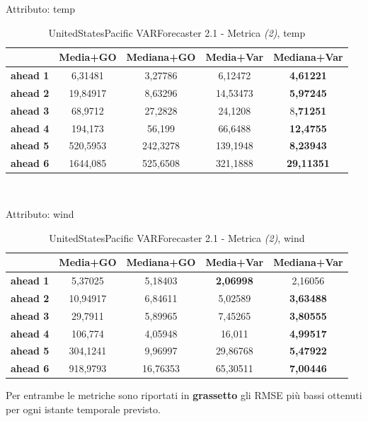 \documentclass[12pt,a4paper,oneside,openright]{book}
\begin{document}
\medskip

Attributo: temp \\ 

\begin{table}[H]
\centering
\begin{tabular}{|c|c|c|c|c|}
\hline
 & \textbf{Media+GO} & \textbf{Mediana+GO} & \textbf{Media+Var} & \textbf{Mediana+Var} \\
\hline
\textbf{ahead 1} & 6,31481 & 3,27786 & 6,12472 & \textbf{4,61221} \\
\hline
\textbf{ahead 2} & 19,84917 & 8,63296 & 14,53473 & \textbf{5,97245} \\
\hline
\textbf{ahead 3} & 68,9712 & 27,2828 & 24,1208 & 8\textbf{,71251} \\
\hline
\textbf{ahead 4} & 194,173 & 56,199 & 66,6488 & \textbf{12,4755} \\
\hline
\textbf{ahead 5} & 520,5953 & 242,3278 & 139,1948 & \textbf{8,23943} \\
\hline
\textbf{ahead 6} & 1644,085 & 525,6508 & 321,1888 & \textbf{29,11351} \\
\hline
\end{tabular} \\
\caption{UnitedStatesPacific VARForecaster 2.1 - Metrica \textit{(2)}, temp}
\end{table}

\medskip

Attributo: wind \\ 

\begin{table}[H]
\centering
\begin{tabular}{|c|c|c|c|c|}
\hline
 & \textbf{Media+GO} & \textbf{Mediana+GO} & \textbf{Media+Var} & \textbf{Mediana+Var} \\
\hline
\textbf{ahead 1} & 5,37025 & 5,18403 & \textbf{2,06998} & 2,16056 \\
\hline
\textbf{ahead 2} & 10,94917 & 6,84611 & 5,02589 & \textbf{3,63488} \\
\hline
\textbf{ahead 3} & 29,7911 & 5,89965 & 7,45265 & \textbf{3,80555} \\
\hline
\textbf{ahead 4} & 106,774 & 4,05948 & 16,011 & \textbf{4,99517} \\
\hline
\textbf{ahead 5} & 304,1241 & 9,96997 & 29,86768 & \textbf{5,47922} \\
\hline
\textbf{ahead 6} & 918,9793 & 16,76353 & 65,30511 & \textbf{7,00446} \\
\hline
\end{tabular} 
\caption{UnitedStatesPacific VARForecaster 2.1 - Metrica \textit{(2)}, wind}
\end{table}
\newpage
Per entrambe le metriche sono riportati in \textbf{grassetto} gli RMSE più bassi ottenuti per ogni istante temporale previsto. 
\end{document}
